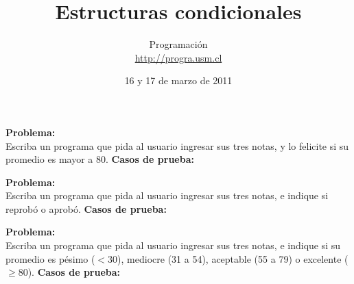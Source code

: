 \documentclass[12pt]{beamer}
\title{Estructuras condicionales}
\author{
  Programación \\ \url{http://progra.usm.cl}
}
\date{16 y 17 de marzo de 2011}
\begin{document}
  \begin{frame}
    \maketitle
  \end{frame}

  \begin{frame}
    \label{problema-if}
    \textbf{Problema:}\\
    Escriba un programa que pida al usuario
    ingresar sus tres notas,
    y lo felicite si su promedio es mayor a 80.
    \vfill
    \textbf{Casos de prueba:}\\
    
    
  \end{frame}

  \begin{frame}
    \label{solucion-if}
    
  \end{frame}

  \begin{frame}
    \label{problema-if-else}
    \textbf{Problema:}\\
    Escriba un programa que pida al usuario
    ingresar sus tres notas,
    e indique si reprobó o aprobó.
    \vfill
    \textbf{Casos de prueba:}\\
    
    
  \end{frame}

  \begin{frame}
    \label{solucion-if-else}
    
  \end{frame}

  \begin{frame}
    \label{problema-if-elif}
    \textbf{Problema:}\\
    Escriba un programa que pida al usuario
    ingresar sus tres notas,
    e indique si su promedio
    es pésimo (\(<30\)),  mediocre (31 a 54),
    aceptable (55 a 79) o excelente (\(\ge 80\)).
    \vfill
    \textbf{Casos de prueba:}\\
    
    
  \end{frame}
\end{document}
